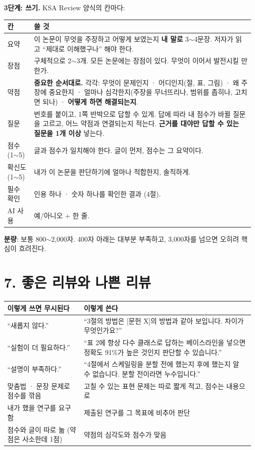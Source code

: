 \documentclass[11pt]{article}
\begin{document}
\noindent\textbf{3단계: 쓰기.} KSA Review 양식의 칸마다:
\begin{center}
\small
\begin{tabular}{@{}p{2.6cm}p{10.6cm}@{}}
\toprule
\textbf{칸} & \textbf{쓸 것} \\
\midrule
요약 & 이 논문이 무엇을 주장하고 어떻게 보였는지 \textbf{내 말로} 3$\sim$4문장. 저자가 읽고 ``제대로 이해했구나'' 해야 한다. \\
장점 & 구체적으로 2$\sim$3개. 모든 논문에는 장점이 있다. 무엇이 이어서 발전시킬 만한가. \\
약점 & \textbf{중요한 순서대로.} 각각: 무엇이 문제인지 · 어디인지(절, 표, 그림) · 왜 주장에 중요한지 · 얼마나 심각한지(주장을 무너뜨리나, 범위를 좁히나, 고치면 되나) · \textbf{어떻게 하면 해결되는지}. \\
질문 & 번호를 붙이고, 1쪽 반박으로 답할 수 있게. 답에 따라 내 점수가 바뀔 질문을 고르고, 어느 약점과 연결되는지 적는다. \textbf{근거를 대야만 답할 수 있는 질문을 1개 이상} 넣는다. \\
점수 (1$\sim$5) & 글과 점수가 일치해야 한다. 글이 먼저, 점수는 그 요약이다. \\
확신도 (1$\sim$5) & 내가 이 논문을 판단하기에 얼마나 적합한지, 솔직하게. \\
필수 확인 & 인용 하나 · 숫자 하나를 확인한 결과 (4절). \\
AI 사용 & 예/아니오 + 한 줄. \\
\bottomrule
\end{tabular}
\end{center}

\noindent\textbf{분량}: 보통 800$\sim$2,000자. 400자 아래는 대부분 부족하고, 3,000자를 넘으면 오히려 핵심이 흐려진다.

\section*{7. 좋은 리뷰와 나쁜 리뷰}
\begin{center}
\small
\begin{tabular}{@{}p{6.6cm}p{6.6cm}@{}}
\toprule
\textbf{이렇게 쓰면 무시된다} & \textbf{이렇게 쓴다} \\
\midrule
``새롭지 않다.'' & ``3절의 방법은 [문헌 X]의 방법과 같아 보입니다. 차이가 무엇인가요?'' \\
``실험이 더 필요하다.'' & ``표 2에 항상 다수 클래스로 답하는 베이스라인을 넣으면 정확도 91\%가 높은 것인지 판단할 수 있습니다.'' \\
``설명이 부족하다.'' & ``4절에서 스케일링을 분할 전에 했는지 후에 했는지 알 수 없습니다. 분할 전이라면 누수입니다.'' \\
맞춤법 · 문장 문제로 점수를 깎음 & 고칠 수 있는 표현 문제는 따로 짧게 적고, 점수는 내용으로 \\
내가 했을 연구를 요구함 & 제출된 연구를 그 목표에 비추어 판단 \\
점수와 글이 따로 놂 (약점은 사소한데 1점) & 약점의 심각도와 점수가 맞음 \\
\bottomrule
\end{tabular}
\end{center}
\end{document}
